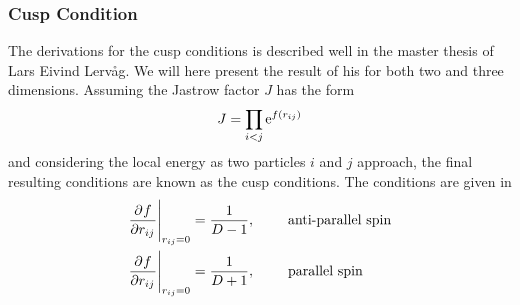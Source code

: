     \subsubsection{Cusp Condition\label{sususec:cusp_condition}}
        The derivations for the cusp conditions is described well in the master
        thesis of Lars Eivind Lervåg\cite{larsEivindThesis}. We will here
        present the result of his for both two and three dimensions. Assuming
        the Jastrow factor $J$ has the form
            \begin{equation}
                J = \prod_{i<j} \mathrm{e}^{f\left(r_{ij}\right)}
            \end{equation}
        and considering the local energy as two particles $i$ and $j$ approach,
        the final resulting conditions are known as the cusp conditions. The
        conditions are given in 
            \begin{equation} 
                \begin{aligned}
                    \prd{r_{ij}}[f] \Bigg|_{r_{ij}=0} &=
                    \frac{1}{D-1},&\indent& \text{anti-parallel spin} \\
                    \prd{r_{ij}}[f] \Bigg|_{r_{ij}=0} &=
                    \frac{1}{D+1},&\indent& \text{parallel spin}
                \end{aligned}
                \label{eq:cuspconditionsDef}
            \end{equation}
    
